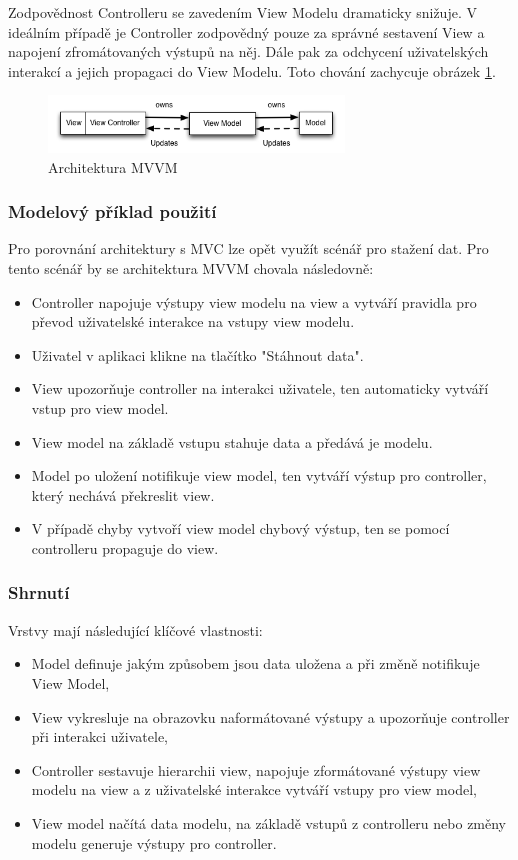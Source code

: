 Zodpovědnost Controlleru se zavedením View Modelu dramaticky snižuje.
V ideálním případě je Controller zodpovědný pouze za správné sestavení View a napojení zfromátovaných výstupů na něj.
Dále pak za odchycení uživatelských interakcí a jejich propagaci do View Modelu.
Toto chování zachycuje obrázek \ref{architektura-mvvm}.

\begin{figure}\centering
	\includegraphics[width=0.7\textwidth]{assets/mvvm-architecture.png}
	\caption[Architektura MVVM]{Architektura MVVM}\label{architektura-mvvm}
\end{figure}

\subsubsection{Modelový příklad použití} \label{architektura-mvvm-priklad}

Pro porovnání architektury s MVC lze opět využít scénář pro stažení dat. Pro tento scénář by se architektura MVVM chovala následovně:
\begin{itemize}
  \item Controller napojuje výstupy view modelu na view a vytváří pravidla pro převod uživatelské interakce na vstupy view modelu.
  \item Uživatel v aplikaci klikne na tlačítko "Stáhnout data".
  \item View upozorňuje controller na interakci uživatele, ten automaticky vytváří vstup pro view model.
  \item View model na základě vstupu stahuje data a předává je modelu.
  \item Model po uložení notifikuje view model, ten vytváří výstup pro controller, který nechává překreslit view.
  \item V případě chyby vytvoří view model chybový výstup, ten se pomocí controlleru propaguje do view.
\end{itemize}

\subsubsection{Shrnutí} \label{architektura-mvvm-shrnuti}

Vrstvy mají následující klíčové vlastnosti:
\begin{itemize}
  \item Model definuje jakým způsobem jsou data uložena a při změně notifikuje View Model,
  \item View vykresluje na obrazovku naformátované výstupy a upozorňuje controller při interakci uživatele,
  \item Controller sestavuje hierarchii view, napojuje zformátované výstupy view modelu na view a z uživatelské interakce vytváří vstupy pro view model,
  \item View model načítá data modelu, na základě vstupů z controlleru nebo změny modelu generuje výstupy pro controller.
\end{itemize}

